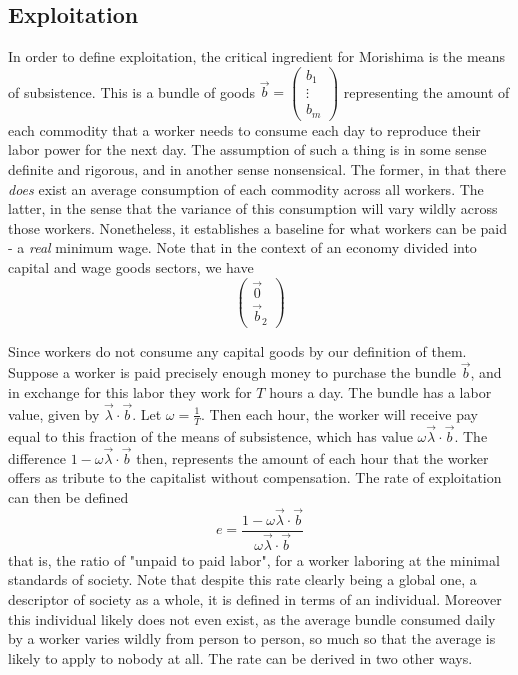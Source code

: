 \documentclass{article}
\theoremstyle{definition}
\theoremstyle{plain}
\theoremstyle{theorem}
\begin{document}
\subsection{Exploitation}
In order to define exploitation, the critical ingredient for Morishima is the means of subsistence. This is a bundle of goods $\vec{b} = \begin{pmatrix} b_1 \\ \vdots \\ b_m \end{pmatrix}$ representing the amount of each commodity that a worker needs to consume each day to reproduce their labor power for the next day. The assumption of such a thing is in some sense definite and rigorous, and in another sense nonsensical. The former, in that there \textit{does} exist an average consumption of each commodity across all workers. The latter, in the sense that the variance of this consumption will vary wildly across those workers. Nonetheless, it establishes a baseline for what workers can be paid - a \textit{real} minimum wage. Note that in the context of an economy divided into capital and wage goods sectors, we have 
\[ \begin{pmatrix} \vec{0} \\ \vec{b}_2 \end{pmatrix} \] \par
Since workers do not consume any capital goods by our definition of them. Suppose a worker is paid precisely enough money to purchase the bundle $\vec{b}$, and in exchange for this labor they work for $T$ hours a day. The bundle has a labor value, given by $\vec{\lambda} \cdot \vec{b}$. Let $\omega = \frac{1}{T}$. Then each hour, the worker will receive pay equal to this fraction of the means of subsistence, which has value $\omega \vec{\lambda}\cdot \vec{b}$. The difference $1-\omega\vec{\lambda}\cdot \vec{b}$ then, represents the amount of each hour that the worker offers as tribute to the capitalist without compensation. The rate of exploitation can then be defined
\[ e = \frac{1-\omega\vec{\lambda}\cdot \vec{b}}{\omega\vec{\lambda}\cdot \vec{b}} \]   
that is, the ratio of "unpaid to paid labor", for a worker laboring at the minimal standards of society. Note that despite this rate clearly being a global one, a descriptor of society as a whole, it is defined in terms of an individual. Moreover this individual likely does not even exist, as the average bundle consumed daily by a worker varies wildly from person to person, so much so that the average is likely to apply to nobody at all. The rate can be derived in two other ways. \par 
\end{document}
